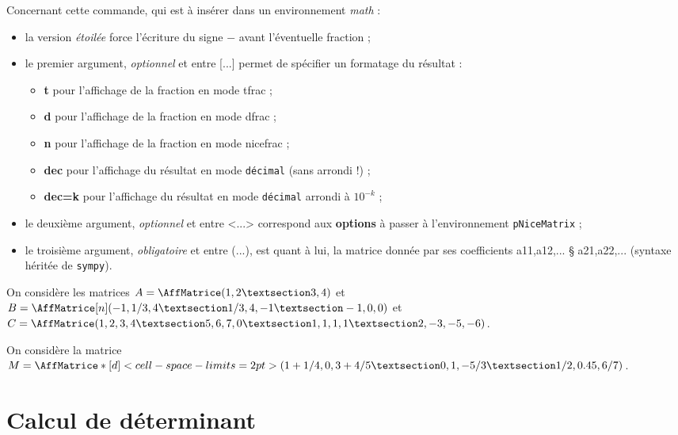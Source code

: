 \documentclass[a4paper,11pt]{article}
\newcommand\Cle[1]{{\bfseries\sffamily\textlangle #1\textrangle}}
\begin{document}
\begin{tipblock}
Concernant cette commande, qui est à insérer dans un environnement \textit{math} :

\begin{itemize}
	\item la version \textit{étoilée} force l'écriture du signe \og $-$ \fg{} avant l'éventuelle fraction ;
	\item le premier argument, \textit{optionnel} et entre \textsf{[...]} permet de spécifier un formatage du résultat :
	\begin{itemize}
		\item \Cle{t} pour l'affichage de la fraction en mode \textsf{tfrac} ;
		\item \Cle{d} pour l'affichage de la fraction en mode \textsf{dfrac} ;
		\item \Cle{n} pour l'affichage de la fraction en mode \textsf{nicefrac} ;
		\item \Cle{dec} pour l'affichage du résultat en mode \texttt{décimal} (sans arrondi !) ;
		\item \Cle{dec=k} pour l'affichage du résultat en mode \texttt{décimal} arrondi à $10^{-k}$ ;
	\end{itemize}
	\item le deuxième argument, \textit{optionnel} et entre \textsf{<...>} correspond aux \Cle{options} à passer à l'environnement \texttt{pNiceMatrix} ;
	\item le troisième argument, \textit{obligatoire} et entre \textsf{(...)}, est quant à lui, la matrice donnée par ses coefficients \textsf{a11,a12,... § a21,a22,...} (syntaxe héritée de \texttt{sympy}).
\end{itemize}
\vspace*{-\baselineskip}\leavevmode
\end{tipblock}

\begin{PresentationCode}{}
On considère les matrices $A=\AffMatrice(1,2 § 3,4)$
et $B=\AffMatrice[n](-1,1/3,4 § 1/3,4,-1 § -1,0,0)$
et $C=\AffMatrice(1,2,3,4 § 5,6,7,0 § 1,1,1,1 § 2,-3,-5,-6)$.
\end{PresentationCode}

\begin{PresentationCode}{}
On considère la matrice
$M=\AffMatrice*[d]<cell-space-limits=2pt>(1+1/4,0,3+4/5 § 0,1,-5/3 § 1/2,0.45,6/7)$.
\end{PresentationCode}

\pagebreak

\section{Calcul de déterminant}
\end{document}
